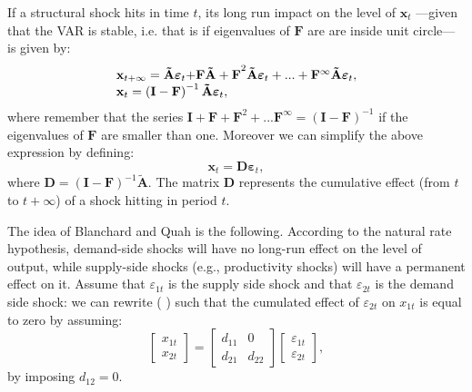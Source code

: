 \documentclass[11pt,a4paper]{report}
\numberwithin{equation}{chapter}
\numberwithin{section}{chapter}
\begin{document}
If a structural shock hits in time $t$, its long run impact on the level of $%
\mathbf{x}_{t}$ ---given that the VAR is stable, i.e. that is if eigenvalues
of $\mathbf{F}$ are are inside unit circle--- is given by:%
\begin{equation}
\begin{array}{l}
\mathbf{x}_{t+\infty }=\mathbf{\tilde{A}\varepsilon }_{t}\mathbf{+F\tilde{A}%
+F}^{2}\mathbf{\tilde{A}\varepsilon }_{t}+...+\mathbf{F}^{\infty }\mathbf{%
\tilde{A}\varepsilon }_{t}, \\ 
\mathbf{x}_{t}=\left( \mathbf{I}-\mathbf{F}\right) ^{-1}\mathbf{\tilde{A}%
\varepsilon }_{t},%
\end{array}
\label{eq:VMA_red}
\end{equation}%
where remember that the series $\mathbf{I}+\mathbf{F}+\mathbf{F}^{2}+...%
\mathbf{F}^{\infty }=\left( \mathbf{I}-\mathbf{F}\right) ^{-1}$ if the
eigenvalues of $\mathbf{F}$ are smaller than one. Moreover we can simplify
the above expression by defining: 
\begin{equation}
\mathbf{x}_{t}=\mathbf{D\varepsilon }_{t},  \label{eq:VMA_struct}
\end{equation}%
where $\mathbf{D}=\left( \mathbf{I}-\mathbf{F}\right) ^{-1}\mathbf{\tilde{A}}
$. The matrix $\mathbf{D}$ represents the cumulative effect (from $t$ to $%
t+\infty $) of a shock hitting in period $t$.

The idea of Blanchard and Quah is the following. According to the natural
rate hypothesis, demand-side shocks will have no long-run effect on the
level of output, while supply-side shocks (e.g., productivity shocks) will
have a permanent effect on it. Assume that $\varepsilon _{1t}$ is the supply
side shock and that $\varepsilon _{2t}$ is the demand side shock: we can
rewrite (%
) such that the cumulated effect of $\varepsilon _{2t}$
on $x_{1t}$ is equal to zero by assuming:%
\begin{equation*}
\left[ 
\begin{array}{c}
x_{1t} \\ 
x_{2t}%
\end{array}%
\right] =\left[ 
\begin{array}{cc}
d_{11} & 0 \\ 
d_{21} & d_{22}%
\end{array}%
\right] \left[ 
\begin{array}{c}
\varepsilon _{1t} \\ 
\varepsilon _{2t}%
\end{array}%
\right] ,
\end{equation*}%
by imposing $d_{12}=0$.
\end{document}
